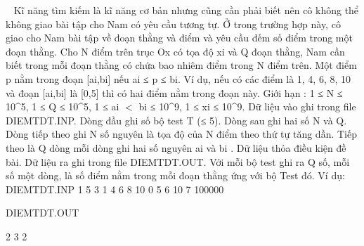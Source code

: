 

 
Kĩ năng tìm kiếm là kĩ năng cơ bản nhưng cũng cần phải biết nên cô không thể không
giao bài tập cho Nam có yêu cầu tương tự. Ở trong trường hợp này, cô giao cho Nam bài
tập về đoạn thằng và điểm và yêu cầu đếm số điểm trong một đoạn thằng.
Cho N điểm trên trục Ox có tọa độ xi và Q đoạn thằng, Nam cần biết trong mỗi đoạn
thằng có chứa bao nhiêm điểm trong N điểm trên. Một điểm p nằm trong đoạn [ai,bi]
nếu ai ≤ p ≤ bi. Ví dụ, nếu có các điểm là 1, 4, 6, 8, 10 và đoạn [ai,bi] là [0,5] thì có hai
điểm nằm trong đoạn này.
Giới hạn : 1 ≤ N ≤ 10\textasciicircum5, 1 ≤ Q ≤ 10\textasciicircum5, 1 ≤ ai $<$ bi ≤ 10\textasciicircum9, 1 ≤ xi ≤ 10\textasciicircum9.
Dữ liệu vào ghi trong file DIEMTDT.INP. Dòng đầu ghi số bộ test T (≤ 5). Dòng sau ghi
hai số N và Q. Dòng tiếp theo ghi N số nguyên là tọa độ của N điểm theo thứ tự tăng dần.
Tiếp theo là Q dòng mỗi dòng ghi hai số nguyên ai và bi . Dữ liệu thỏa điều kiện đề bài.
Dữ liệu ra ghi trong file DIEMTDT.OUT. Với mỗi bộ test ghi ra Q số, mỗi số một dòng,
là số điểm nằm trong mỗi đoạn thằng ứng với bộ Test đó.
Ví dụ:
DIEMTDT.INP
1
5 3
1 4 6 8 10
0 5
6 10
7 100000


DIEMTDT.OUT

2
3
2
